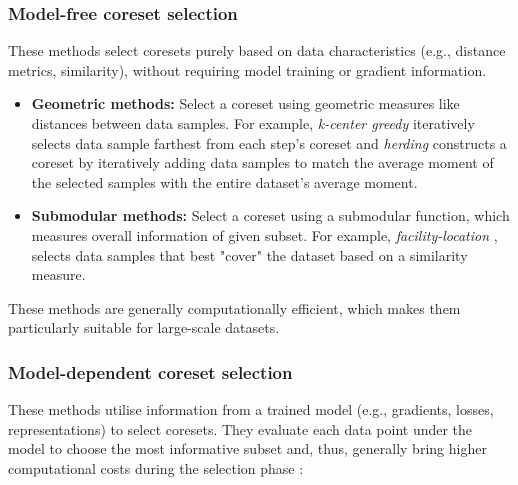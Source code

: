 \subsubsection{Model-free coreset selection}
These methods select coresets purely based on data characteristics (e.g., distance metrics, similarity), without requiring model training or gradient information.
\begin{itemize}
    \item \textbf{Geometric methods:} Select a coreset using geometric measures like distances between data samples. For example, \textit{k-center greedy} \cite{sener_active_2018} iteratively selects data sample farthest from each step's coreset and \textit{herding} \cite{welling_herding_2009} constructs a coreset by iteratively adding data samples to match the average moment of the selected samples with the entire dataset's average moment.
    \item \textbf{Submodular methods:} Select a coreset using a submodular function, which measures overall information of given subset. For example, \textit{facility-location} \cite{kothawade_prism_2022}, selects data samples that best "cover" the dataset based on a similarity measure.
\end{itemize}
These methods are generally computationally efficient, which makes them particularly suitable for large-scale datasets.

\subsubsection{Model-dependent coreset selection}
These methods utilise information from a trained model (e.g., gradients, losses, representations) to select coresets. They evaluate each data point under the model to choose the most informative subset and, thus, generally bring higher computational costs during the selection phase :

